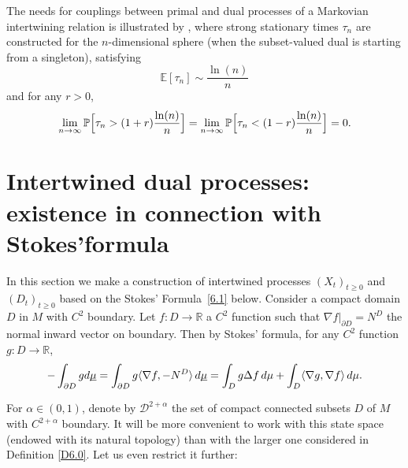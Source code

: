 \documentclass[10pt]{amsart}
\theoremstyle{plain}
\theoremstyle{definition}
\newcommand{\EE}{{\mathbb E}}
\newcommand{\RR}{{\mathbb R}}
\newcommand{\PP}{{\mathbb P}}
\newcommand{\SD}{{\mathscr D}}
\newcommand{\barD}{D}
\newcommand{\usm}{{\underline{\smash{\mu}}}}
\let\f\frac
\let\a\alpha
\let\n\nabla
\begin{document}
The needs for couplings between primal and dual processes of a Markovian intertwining relation is illustrated by \cite{ACM3:22}, where strong stationary times $\tau_n$ are constructed for the $n$-dimensional sphere (when the subset-valued dual is starting from a singleton), satisfying
\[
\EE[\tau_n]\sim \f{\ln(n)}n
\]
and for any $r>0$,
\[
\lim_{n\to\infty}\PP\Bigl[\tau_n>(1+r)\f{\ln(n)}n\Bigr]=\lim_{n\to\infty}\PP\Bigl[\tau_n<(1-r)\f{\ln(n)}n\Bigr]=0.
\]

\section{Intertwined dual processes: existence in connection with Stokes'\nobreakspace formula}
\label{Section6}

In this section we make a construction of intertwined processes $(X_t)_{t\geq 0}$ and $(D_t)_{t\geq 0}$ based on the Stokes' Formula~\eqref{6.1} below. Consider a compact domain $D$ in $M$ with $C^2$ boundary. Let $f: \barD \to \RR$ a $C^2$ function such that $\n f|_{\partial D}=N^D$ the normal inward vector on boundary. Then by Stokes' formula, for any $C^2$ function $g: \barD \to \RR$,
\begin{equation}
\label{6.1}
-\int_{\partial D}g d\usm =\int_{\partial D} g\langle \n f, -N^D\rangle \,d\usm =\int_Dg\Delta f\, d\mu+\int_D\langle \n g,\n f\rangle \, d\mu.
\end{equation}

For $\a\in(0,1)$, denote by $\SD^{2+\a}$ the set of compact connected subsets $D$ of $M$ with $C^{2+\a}$ boundary.
It will be more convenient to work with this state space (endowed with its natural topology) than with the larger one considered in Definition \ref{D6.0}.
Let us even restrict it further:
\end{document}
